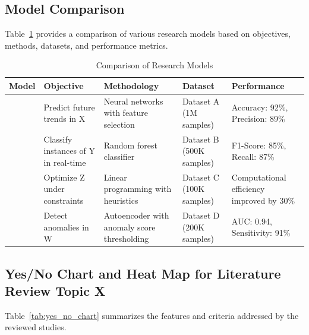 \documentclass[conference]{IEEEtran}
\begin{document}
\subsection{Model Comparison}

Table~\ref{tab:model_comparison} provides a comparison of various research models based on objectives, methods, datasets, and performance metrics.

\begin{table}[htbp]
	\caption{Comparison of Research Models}
	\label{tab:model_comparison}
	\centering
	\renewcommand{\arraystretch}{1.2} %
	\begin{tabularx}{\linewidth}{|X|X|X|X|X|}
		\hline
		\textbf{Model} & \textbf{Objective} & \textbf{Methodology} & \textbf{Dataset} & \textbf{Performance} \\ \hline
		\textcite{model1} & Predict future trends in X & Neural networks with feature selection & Dataset A (1M samples) & Accuracy: 92\%, Precision: 89\% \\ \hline
		\textcite{model2} & Classify instances of Y in real-time & Random forest classifier & Dataset B (500K samples) & F1-Score: 85\%, Recall: 87\% \\ \hline
		\textcite{model3} & Optimize Z under constraints & Linear programming with heuristics & Dataset C (100K samples) & Computational efficiency improved by 30\% \\ \hline
		\textcite{model4} & Detect anomalies in W & Autoencoder with anomaly score thresholding & Dataset D (200K samples) & AUC: 0.94, Sensitivity: 91\% \\ \hline
	\end{tabularx}
\end{table}


\subsection{Yes/No Chart and Heat Map for Literature Review Topic X}

Table~\ref{tab:yes_no_chart} summarizes the features and criteria addressed by the reviewed studies.
\end{document}
